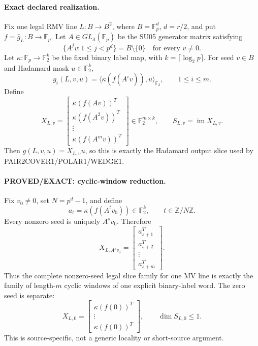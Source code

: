 \documentclass[11pt]{article}
\begin{document}
\paragraph{Exact declared realization.}
Fix one legal RMV line \(L:B\to B^2\), where \(B=\mathbb F_p^d\), \(d=r/2\), and put \(f=\widehat g_L:B\to\mathbb F_p\). Let \(A\in GL_d(\mathbb F_p)\) be the SU05 generator matrix satisfying
\[
\{A^jv:1\le j<p^d\}=B\setminus\{0\}\quad\text{for every }v\ne0.
\]
Let \(\kappa:\mathbb F_p\to\mathbb F_2^k\) be the fixed binary label map, with \(k=\lceil\log_2p\rceil\). For seed \(v\in B\) and Hadamard mask \(u\in\mathbb F_2^k\),
\[
\boxed{g_i(L,v,u)=\langle \kappa(f(A^iv)),u\rangle_{\mathbb F_2}},\qquad1\le i\le m.
\]
Define
\[
\boxed{
X_{L,v}=
\begin{bmatrix}
\kappa(f(Av))^T\\
\kappa(f(A^2v))^T\\
\vdots\\
\kappa(f(A^mv))^T
\end{bmatrix}\in\mathbb F_2^{m\times k},
\qquad S_{L,v}=\operatorname{im}X_{L,v}.
}
\]
Then \(g(L,v,u)=X_{L,v}u\), so this is exactly the Hadamard output slice used by PAIR2COVER1/POLAR1/WEDGE1.

\paragraph{PROVED/EXACT: cyclic-window reduction.}
Fix \(v_0\ne0\), set \(N=p^d-1\), and define
\[
a_t=\kappa(f(A^tv_0))\in\mathbb F_2^k,\qquad t\in\mathbb Z/N\mathbb Z.
\]
Every nonzero seed is uniquely \(A^sv_0\). Therefore
\[
\boxed{
X_{L,A^sv_0}=
\begin{bmatrix}
a_{s+1}^T\\
a_{s+2}^T\\
\vdots\\
a_{s+m}^T
\end{bmatrix}.
}
\]
Thus the complete nonzero-seed legal slice family for one MV line is exactly the family of length-\(m\) cyclic windows of one explicit binary-label word. The zero seed is separate:
\[
X_{L,0}=
\begin{bmatrix}
\kappa(f(0))^T\\
\vdots\\
\kappa(f(0))^T
\end{bmatrix},\qquad \dim S_{L,0}\le1.
\]
This is source-specific, not a generic locality or short-source argument.
\end{document}
